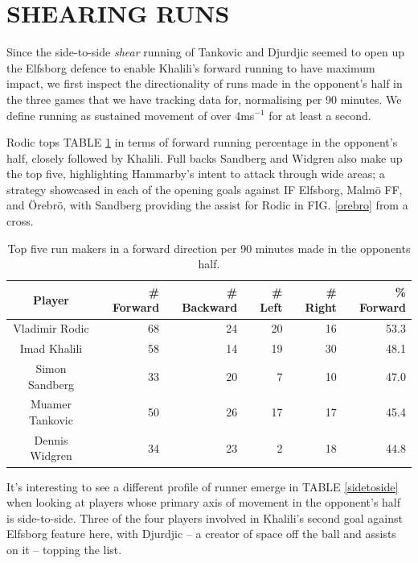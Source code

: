 \documentclass[twocolumn,prl,nobalancelastpage,aps,10pt]{revtex4-1}
\begin{document}
\section{SHEARING RUNS}

Since the side-to-side \textit{shear} running of Tankovic and Djurdjic seemed to open up the Elfsborg defence to enable Khalili's forward running to have maximum impact, we first inspect the directionality of runs made in the opponent's half in the three games that we have tracking data for, normalising per 90 minutes. We define running as sustained movement of over 4ms$^{-1}$ for at least a second.

Rodic tops TABLE \ref{runs} in terms of forward running percentage in the opponent's half, closely followed by Khalili. Full backs Sandberg and Widgren also make up the top five, highlighting Hammarby's intent to attack through wide areas;  a strategy showcased in each of the opening goals against IF Elfsborg, Malm{\"o} FF, and {\"O}rebr{\"o}, with Sandberg providing the assist for Rodic in FIG. \ref{orebro} from a cross.

\begin{table}[h!]
\begin{tabular}{|c|r|r|r|r|r|}
\hline
\toprule
            Player &     \# Forward &     \# Backward &     \# Left &     \# Right &  \% Forward \\
\hline
\midrule
  Vladimir Rodic &  68 &  24 &  20 &  16 &       53.3 \\
    Imad Khalili &  58 &  14 &  19 &  30 &       48.1 \\
  Simon Sandberg &  33 &  20 &   7 &  10 &       47.0 \\
 Muamer Tankovic &  50 &  26 &  17 &  17 &       45.4 \\
  Dennis Widgren &  34 &  23 &   2 &  18 &       44.8 \\
\bottomrule
\hline
\end{tabular}
\caption{Top five run makers in a forward direction per 90 minutes made in the opponents half.}
\label{runs}
\end{table}

It's interesting to see a different profile of runner emerge in TABLE \ref{sidetoside} when looking at players whose primary axis of movement in the opponent's half is side-to-side. Three of the four players involved in Khalili's second goal against Elfsborg feature here, with Djurdjic -- a creator of space off the ball and assists on it -- topping the list.
\end{document}
